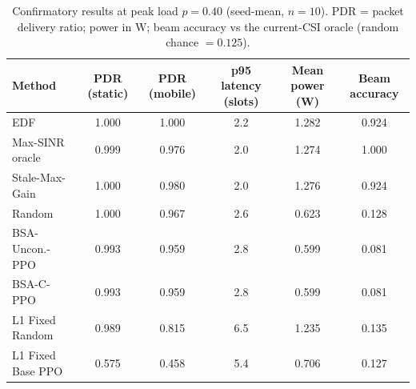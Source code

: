 \begin{table}[t]\centering\small
\caption{Confirmatory results at peak load $p=0.40$ (seed-mean, $n=10$). PDR = packet delivery ratio; power in W; beam accuracy vs the current-CSI oracle (random chance $=0.125$).}\label{tab:p40}
\begin{tabular}{@{}lccccc@{}}\toprule
Method & PDR (static) & PDR (mobile) & p95 latency (slots) & Mean power (W) & Beam accuracy \\ \midrule
EDF & 1.000 & 1.000 & 2.2 & 1.282 & 0.924 \\
Max-SINR oracle & 0.999 & 0.976 & 2.0 & 1.274 & 1.000 \\
Stale-Max-Gain & 1.000 & 0.980 & 2.0 & 1.276 & 0.924 \\
Random & 1.000 & 0.967 & 2.6 & 0.623 & 0.128 \\
BSA-Uncon.-PPO & 0.993 & 0.959 & 2.8 & 0.599 & 0.081 \\
BSA-C-PPO & 0.993 & 0.959 & 2.8 & 0.599 & 0.081 \\
L1 Fixed Random & 0.989 & 0.815 & 6.5 & 1.235 & 0.135 \\
L1 Fixed Base PPO & 0.575 & 0.458 & 5.4 & 0.706 & 0.127 \\
\bottomrule\end{tabular}\end{table}